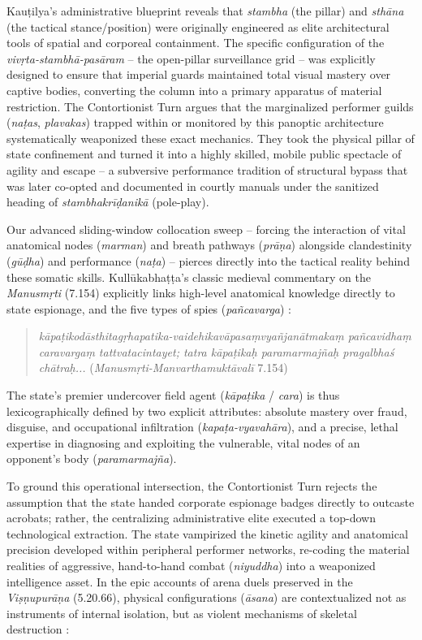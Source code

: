 \documentclass[11pt,twoside,letterpaper]{article}
\begin{document}
Kauṭilya’s administrative blueprint reveals that \textit{stambha} (the pillar) and \textit{sthāna} (the tactical stance/position) were originally engineered as elite architectural tools of spatial and corporeal containment. The specific configuration of the \textit{vivṛta-stambhā-pasāram} – the open-pillar surveillance grid – was explicitly designed to ensure that imperial guards maintained total visual mastery over captive bodies, converting the column into a primary apparatus of material restriction. The Contortionist Turn argues that the marginalized performer guilds (\textit{naṭas}, \textit{plavakas}) trapped within or monitored by this panoptic architecture systematically weaponized these exact mechanics. They took the physical pillar of state confinement and turned it into a highly skilled, mobile public spectacle of agility and escape – a subversive performance tradition of structural bypass that was later co-opted and documented in courtly manuals under the sanitized heading of \textit{stambhakrīḍanikā} (pole-play).

Our advanced sliding-window collocation sweep – forcing the interaction of vital anatomical nodes (\textit{marman}) and breath pathways (\textit{prāṇa}) alongside clandestinity (\textit{gūḍha}) and performance (\textit{naṭa}) – pierces directly into the tactical reality behind these somatic skills. Kullūkabhaṭṭa’s classic medieval commentary on the \textit{Manusmṛti} (7.154) explicitly links high-level anatomical knowledge directly to state espionage, and the five types of spies (\textit{pañcavarga}) \citep{GRETIL_vcp}:

\begin{quote}
\textit{kāpaṭikodāsthitagṛhapatika-vaidehikavāpasaṃvyañjanātmakaṃ pañcavidhaṃ caravargaṃ tattvatacintayet; tatra kāpaṭikaḥ paramarmajñaḥ pragalbhaś chātraḥ...} (\textit{Manusmṛti-Manvarthamuktāvalī} 7.154)
\end{quote}

The state’s premier undercover field agent (\textit{kāpaṭika} / \textit{cara}) is thus lexicographically defined by two explicit attributes: absolute mastery over fraud, disguise, and occupational infiltration (\textit{kapaṭa-vyavahāra}), and a precise, lethal expertise in diagnosing and exploiting the vulnerable, vital nodes of an opponent’s body (\textit{paramarmajña}).

To ground this operational intersection, the Contortionist Turn rejects the assumption that the state handed corporate espionage badges directly to outcaste acrobats; rather, the centralizing administrative elite executed a top-down technological extraction. The state vampirized the kinetic agility and anatomical precision developed within peripheral performer networks, re-coding the material realities of aggressive, hand-to-hand combat (\textit{niyuddha}) into a weaponized intelligence asset. In the epic accounts of arena duels preserved in the \textit{Viṣṇupurāṇa} (5.20.66), physical configurations (\textit{āsana}) are contextualized not as instruments of internal isolation, but as violent mechanisms of skeletal destruction \citep{ViP_5}:
\end{document}
